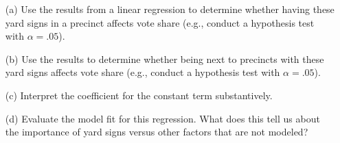 \documentclass[12pt,letterpaper]{article}
\begin{document}
\vspace{.5cm}
\begin{enumerate}
	\item [(a)] Use the results from a linear regression to determine whether having these yard signs in a precinct affects vote share (e.g., conduct a hypothesis test with $\alpha = .05$).
	
	\newpage		
	\item [(b)]  Use the results to determine whether being
	next to precincts with these yard signs affects vote
	share (e.g., conduct a hypothesis test with $\alpha = .05$).
	
	\vspace{7cm}
	\item [(c)] Interpret the coefficient for the constant term substantively.
	\vspace{7cm}
	
	\item [(d)] Evaluate the model fit for this regression.  What does this	tell us about the importance of yard signs versus other factors that are not modeled?
	
\end{enumerate}  
\end{document}

